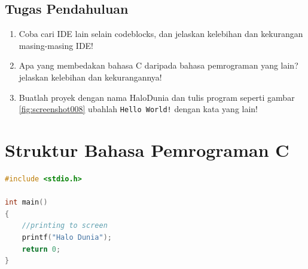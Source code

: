 \subsection{Tugas Pendahuluan}
\begin{enumerate}
	\item Coba cari IDE lain selain codeblocks, dan jelaskan kelebihan dan kekurangan masing-masing IDE!
	\item Apa yang membedakan bahasa C daripada bahasa pemrograman yang lain? jelaskan kelebihan dan kekurangannya!
	\item Buatlah proyek dengan nama HaloDunia dan tulis program seperti gambar \ref{fig:screenshot008} ubahlah \verb|Hello World!| dengan kata yang lain!
\end{enumerate}

%			
%			
%			
\section{Struktur Bahasa Pemrograman C}

\begin{lstlisting}[language=c,caption=Contoh program sederhana dalam bahasa C,label=lst:helloworld,captionpos=t]
#include <stdio.h>

int main()
{
	//printing to screen
	printf("Halo Dunia");
	return 0;
}
\end{lstlisting}


